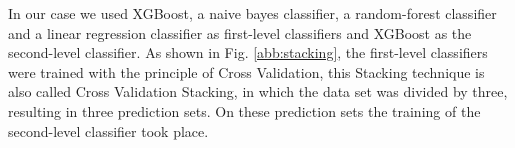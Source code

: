 In our case we used XGBoost, a naive bayes classifier, a random-forest classifier and a linear regression classifier as first-level classifiers and XGBoost as the second-level classifier. As shown in Fig. \ref{abb:stacking}, the first-level classifiers were trained with the principle of Cross Validation, this Stacking technique is also called Cross Validation Stacking, in which the data set was divided by three, resulting in three prediction sets. On these prediction sets the training of the second-level classifier took place. 

